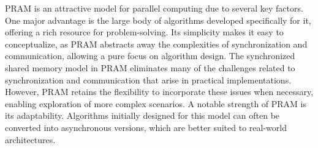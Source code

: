 PRAM is an attractive model for parallel computing due to several key factors. 
One major advantage is the large body of algorithms developed specifically for it, offering a rich resource for problem-solving. 
Its simplicity makes it easy to conceptualize, as PRAM abstracts away the complexities of synchronization and communication, allowing a pure focus on algorithm design.
The synchronized shared memory model in PRAM eliminates many of the challenges related to synchronization and communication that arise in practical implementations. 
However, PRAM retains the flexibility to incorporate these issues when necessary, enabling exploration of more complex scenarios.
A notable strength of PRAM is its adaptability. 
Algorithms initially designed for this model can often be converted into asynchronous versions, which are better suited to real-world architectures. 